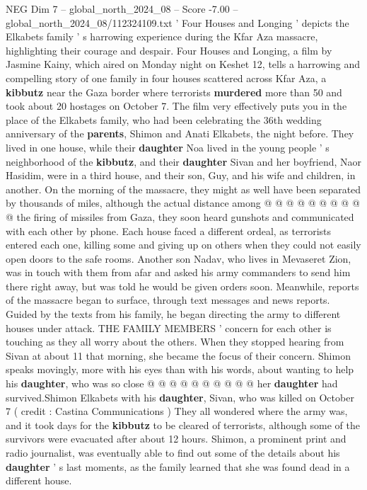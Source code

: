 \begin{textsample}{NEG Dim 7 – global\_north\_2024\_08 – Score -7.00 – global\_north\_2024\_08/112324109.txt}  \label{ex:f7_neg_089}
' Four Houses and Longing ' depicts the Elkabets family ' s harrowing experience during the Kfar Aza massacre, highlighting their courage and despair.
Four Houses and Longing, a film by Jasmine Kainy, which aired on Monday night on Keshet 12, tells a harrowing and compelling story of one family in four houses scattered across Kfar Aza, a \textbf{kibbutz} near the Gaza border where terrorists \textbf{murdered} more than 50 and took about 20 hostages on October 7.
The film very effectively puts you in the place of the Elkabets family, who had been celebrating the 36th wedding anniversary of the \textbf{parents}, Shimon and Anati Elkabets, the night before.
They lived in one house, while their \textbf{daughter} Noa lived in the young people ' s neighborhood of the \textbf{kibbutz}, and their \textbf{daughter} Sivan and her boyfriend, Naor Hasidim, were in a third house, and their son, Guy, and his wife and children, in another.
On the morning of the massacre, they might as well have been separated by thousands of miles, although the actual distance among @ @ @ @ @ @ @ @ @ @ the firing of missiles from Gaza, they soon heard gunshots and communicated with each other by phone.
Each house faced a different ordeal, as terrorists entered each one, killing some and giving up on others when they could not easily open doors to the safe rooms.
Another son Nadav, who lives in Mevaseret Zion, was in touch with them from afar and asked his army commanders to send him there right away, but was told he would be given orders soon.
Meanwhile, reports of the massacre began to surface, through text messages and news reports.
Guided by the texts from his family, he began directing the army to different houses under attack.
THE FAMILY MEMBERS ' concern for each other is touching as they all worry about the others.
When they stopped hearing from Sivan at about 11 that morning, she became the focus of their concern.
Shimon speaks movingly, more with his eyes than with his words, about wanting to help his \textbf{daughter}, who was so close @ @ @ @ @ @ @ @ @ @ her \textbf{daughter} had survived.Shimon Elkabets with his \textbf{daughter}, Sivan, who was killed on October 7 ( credit : Castina Communications ) They all wondered where the army was, and it took days for the \textbf{kibbutz} to be cleared of terrorists, although some of the survivors were evacuated after about 12 hours.
Shimon, a prominent print and radio journalist, was eventually able to find out some of the details about his \textbf{daughter} ' s last moments, as the family learned that she was found dead in a different house.

\end{textsample}
